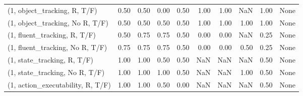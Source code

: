 \begin{table*}[h!]
\begin{adjustbox}{width=2\columnwidth,center}
\begin{tabular}{lrrr|rrr|rrr}
\midrule
(1, object\_tracking, R, T/F)         &                      0.50 &                  0.50 &                      0.00 &                          0.50 &                      1.00 &                          1.00 &                                    NaN &                               1.00 &                                  None \\
(1, object\_tracking, No R, T/F)      &                      0.50 &                  0.50 &                      0.50 &                          0.50 &                      1.00 &                          1.00 &                                   1.00 &                               1.00 &                                  None \\
(1, fluent\_tracking, R, T/F)         &                      0.50 &                  0.75 &                      0.75 &                          0.50 &                      0.00 &                          0.00 &                                    NaN &                               0.25 &                                  None \\
(1, fluent\_tracking, No R, T/F)      &                      0.75 &                  0.75 &                      0.75 &                          0.50 &                      0.00 &                          0.00 &                                   0.50 &                               0.25 &                                  None \\
(1, state\_tracking, R, T/F)          &                      1.00 &                  1.00 &                      0.50 &                          0.50 &                       NaN &                           NaN &                                    NaN &                               0.50 &                                  None \\
(1, state\_tracking, No R, T/F)       &                      1.00 &                  1.00 &                      1.00 &                          0.50 &                       NaN &                           NaN &                                   1.00 &                               0.50 &                                  None \\
(1, action\_executability, R, T/F)    &                      1.00 &                  1.00 &                      0.50 &                          0.00 &                       NaN &                           NaN &                                    NaN &                               0.50 &                                  None \\

\end{tabular}
\end{adjustbox}
\end{table*}
